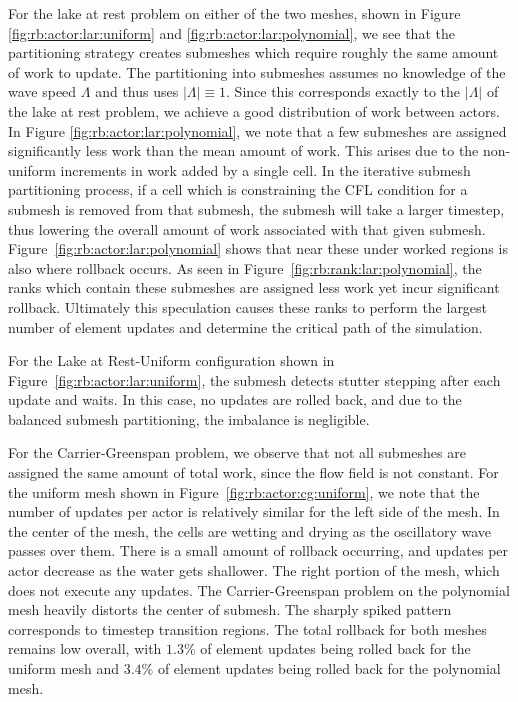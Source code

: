{ For the lake at rest problem on either of the two meshes, shown in Figure \ref{fig:rb:actor:lar:uniform} and \ref{fig:rb:actor:lar:polynomial}, we see that the partitioning strategy creates submeshes which require roughly the same amount of work to update. The partitioning into submeshes assumes no knowledge of the wave speed $\Lambda$ and thus uses $|\Lambda|\equiv 1$. Since this corresponds exactly to the $|\Lambda|$ of the lake at rest problem, we achieve a good distribution of work between actors. In Figure \ref{fig:rb:actor:lar:polynomial}, we note that a few submeshes are assigned significantly less work than the mean amount of work. This arises due to the non-uniform increments in work added by a single cell. In the iterative submesh partitioning process, if a cell which is constraining the CFL condition for a submesh is removed from that submesh, the submesh will take a larger timestep, thus lowering the overall amount of work associated with that given submesh. Figure~\ref{fig:rb:actor:lar:polynomial} shows that near these under worked regions is also where rollback occurs. As seen in Figure~\ref{fig:rb:rank:lar:polynomial}, the ranks which contain these submeshes are assigned less work yet incur significant rollback. Ultimately this speculation causes these ranks to perform the largest number of element updates and determine the critical path of the simulation.
 
For the Lake at Rest-Uniform configuration shown in Figure~\ref{fig:rb:actor:lar:uniform}, the submesh detects stutter stepping after each update and waits. In this case, no updates are rolled back, and due to the balanced submesh partitioning, the imbalance is negligible.


For the Carrier-Greenspan problem, we observe that not all submeshes are assigned the same amount of total work, since the flow field is not constant. For the uniform mesh shown in Figure~\ref{fig:rb:actor:cg:uniform}, we note that the number of updates per actor is relatively similar for the left side of the mesh. In the center of the mesh, the cells are wetting and drying as the oscillatory wave passes over them. 
There is a small amount of rollback occurring, and updates per actor decrease as the water gets shallower. The right portion of the mesh, which does not execute any updates. The Carrier-Greenspan problem on the polynomial mesh heavily distorts the center of submesh. The sharply spiked pattern corresponds to timestep transition regions. The total rollback for both meshes remains low overall, with $1.3\%$ of element updates being rolled back for the uniform mesh and $3.4\%$ of element updates being rolled back for the polynomial mesh. 

}
